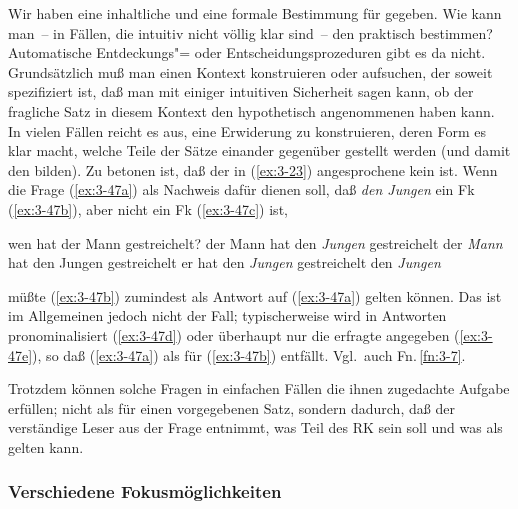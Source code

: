\documentclass[output=paper]{langsci/langscibook}
\begin{document}
Wir haben eine inhaltliche und eine formale Bestimmung für
 gegeben. Wie kann man~-- in Fällen, die intuitiv nicht
völlig klar sind~-- den  praktisch bestimmen? Automatische Entdeckungs"= oder Entscheidungsprozeduren gibt es da nicht. Grundsätzlich muß man einen Kontext konstruieren oder aufsuchen, der soweit spezifiziert ist, daß man mit einiger intuitiven Sicherheit sagen kann, ob der fragliche Satz in diesem Kontext den hypothetisch angenommenen  haben kann. In vielen Fällen reicht es aus, eine  Erwiderung zu konstruieren, deren Form es klar macht, welche Teile der Sätze einander gegenüber gestellt werden (und damit den  bilden). Zu betonen ist, daß der in (\ref{ex:3-23}) angesprochene  kein  ist. Wenn die Frage (\ref{ex:3-47a}) als Nachweis dafür dienen soll, daß \textit{den Jungen} ein Fk (\ref{ex:3-47b}), aber nicht ein Fk (\ref{ex:3-47c}) ist,
\begin{exe}
\ex
\label{ex:3-47}
\begin{xlist}
\ex
\label{ex:3-47a}
wen hat der Mann gestreichelt?
\ex
\label{ex:3-47b}
der Mann hat den \textit{Jungen} gestreichelt
\ex
\label{ex:3-47c}
der \textit{Mann} hat den Jungen gestreichelt
\ex
\label{ex:3-47d}
er hat den \textit{Jungen} gestreichelt
\ex
\label{ex:3-47e}
den \textit{Jungen}
\end{xlist}
\end{exe}
müßte (\ref{ex:3-47b}) zumindest als
 Antwort auf (\ref{ex:3-47a}) gelten können. Das ist im Allgemeinen jedoch nicht der Fall; typischerweise wird in  Antworten pronominalisiert (\ref{ex:3-47d}) oder
überhaupt nur die erfragte  angegeben (\ref{ex:3-47e}), so daß (\ref{ex:3-47a}) als  für (\ref{ex:3-47b}) entfällt. Vgl.\ auch Fn.\,\ref{fn:3-7}.

Trotzdem können solche Fragen in einfachen Fällen die ihnen zugedachte
Aufgabe erfüllen; nicht als  für einen vorgegebenen
Satz, sondern dadurch, daß der verständige Leser aus der Frage
entnimmt, was Teil des RK sein soll und was als  gelten kann.

\subsubsection{Verschiedene Fokusmöglichkeiten}
\label{subsubsec:3-1-3-2}
\end{document}
